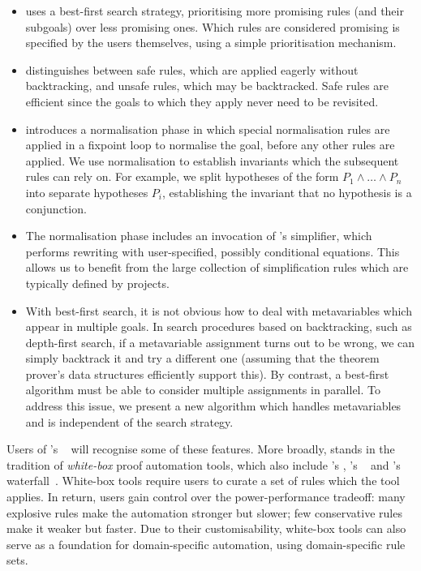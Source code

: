 \begin{itemize}
  \item \Aesop{} uses a best-first search strategy, prioritising more promising
        rules (and their subgoals) over less promising ones. Which rules are
        considered promising is specified by the users themselves, using a
        simple prioritisation mechanism.
  \item \Aesop{} distinguishes between safe rules, which are applied eagerly
        without backtracking, and unsafe rules, which may be backtracked. Safe
        rules are efficient since the goals to which they apply never need to be
        revisited.
  \item \Aesop{} introduces a normalisation phase in which special normalisation
        rules are applied in a fixpoint loop to normalise the goal, before any
        other rules are applied. We use normalisation to establish invariants
        which the subsequent rules can rely on. For example, we split hypotheses
        of the form $P_{1} ∧ \dots ∧ P_{n}$ into separate hypotheses $P_{i}$,
        establishing the invariant that no hypothesis is a conjunction.
  \item The normalisation phase includes an invocation of \Lean's simplifier,
        which performs rewriting with user-specified, possibly conditional
        equations. This allows us to benefit from the large collection of
        simplification rules which are typically defined by \Lean{} projects.
  \item With best-first search, it is not obvious how to deal with metavariables
        which appear in multiple goals. In search procedures based on
        backtracking, such as depth-first search, if a metavariable assignment
        turns out to be wrong, we can simply backtrack it and try a different
        one (assuming that the theorem prover's data structures efficiently
        support this). By contrast, a best-first algorithm must be able to
        consider multiple assignments in parallel. To address this issue, we
        present a new algorithm which handles metavariables and is independent
        of the search strategy.
\end{itemize}

Users of \Isabelle's \auto~\cite{Isabelle,IsabelleAuto} will recognise some of
these features. More broadly, \Aesop{} stands in the tradition of
\emph{white-box} proof automation tools, which also include \Coq's
, \PVS's \grind~\cite{PVS-tutorial} and \ACLtwo's
waterfall~\cite{ACL2}. White-box tools require users to curate a set of rules
which the tool applies. In return, users gain control over the power-performance
tradeoff: many explosive rules make the automation stronger but slower; few
conservative rules make it weaker but faster. Due to their customisability,
white-box tools can also serve as a foundation for domain-specific automation,
using domain-specific rule sets.

